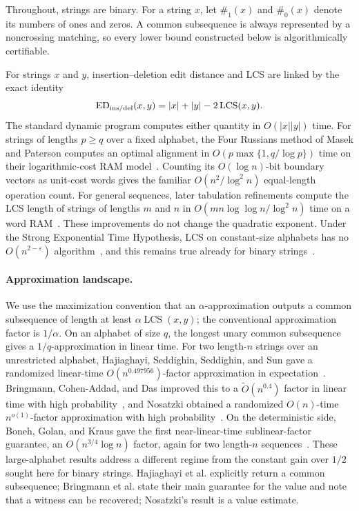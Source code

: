 \documentclass[11pt]{article}
\theoremstyle{remark}
\newcommand{\LCS}{\operatorname{LCS}}
\newcommand{\ones}{\#_1}
\newcommand{\zeros}{\#_0}
\begin{document}
Throughout, strings are binary.  For a string $x$, let $\ones(x)$ and
$\zeros(x)$ denote its numbers of ones and zeros.  A common subsequence is
always represented by a noncrossing matching, so every lower bound constructed
below is algorithmically certifiable.

For strings $x$ and $y$, insertion--deletion edit distance and LCS are linked
by the exact identity
\[
 \operatorname{ED}_{\rm ins/del}(x,y)
 =|x|+|y|-2\LCS(x,y).
\]
The standard dynamic program computes either quantity in
$O(|x||y|)$ time.  For strings of lengths $p\ge q$ over a fixed alphabet, the
Four Russians method of Masek and Paterson computes an optimal alignment in
$O(p\max\{1,q/\log p\})$ time on their logarithmic-cost RAM
model~\cite{MasekPaterson}.  Counting its $O(\log n)$-bit boundary vectors as
unit-cost words gives the familiar $O(n^2/\log^2 n)$ equal-length operation
count.  For general sequences, later tabulation refinements compute the LCS
length of strings of lengths $m$ and $n$ in
$O(mn\log\log n/\log^2 n)$ time on a word RAM~\cite{Grabowski}.  These
improvements do not change the quadratic exponent.  Under the Strong
Exponential Time Hypothesis, LCS on constant-size alphabets has no
$O(n^{2-\varepsilon})$ algorithm~\cite{AbboudBackursWilliams}, and this
remains true already for binary strings~\cite{BringmannKunnemann}.

\paragraph{Approximation landscape.}
We use the maximization convention that an $\alpha$-approximation outputs a
common subsequence of length at least $\alpha\LCS(x,y)$; the conventional
approximation factor is $1/\alpha$.  On an alphabet of size $q$, the longest
unary common subsequence gives a $1/q$-approximation in linear time.  For two
length-$n$ strings over an unrestricted alphabet, Hajiaghayi, Seddighin,
Seddighin, and Sun gave a randomized linear-time
$O(n^{0.497956})$-factor approximation in expectation~\cite{HSSS}.
Bringmann, Cohen-Addad, and Das improved this to a
$\widetilde O(n^{0.4})$ factor in linear time with high
probability~\cite{BringmannCohenAddadDas}, and Nosatzki obtained a randomized
$O(n)$-time $n^{o(1)}$-factor approximation with high
probability~\cite{NosatzkiLCS}.  On the deterministic side, Boneh, Golan, and
Kraus gave the first near-linear-time sublinear-factor guarantee, an
$O(n^{3/4}\log n)$ factor, again for two length-$n$
sequences~\cite{BonehGolanKraus}.  These large-alphabet results address a
different regime from the constant gain over $1/2$ sought here for binary
strings.  Hajiaghayi et al. explicitly return a common subsequence;
Bringmann et al. state their main guarantee for the value and note that a
witness can be recovered; Nosatzki's result is a value estimate.
\end{document}
